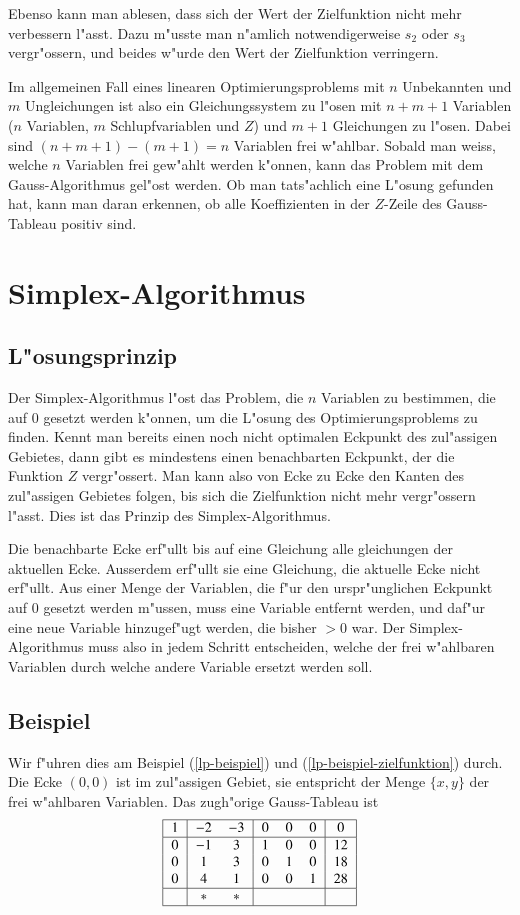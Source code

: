 Ebenso kann man ablesen, dass sich der Wert der Zielfunktion
nicht mehr verbessern l"asst.
Dazu m"usste man n"amlich notwendigerweise $s_2$ oder $s_3$
vergr"ossern, und beides w"urde den Wert der Zielfunktion verringern.

Im allgemeinen Fall eines linearen Optimierungsproblems mit $n$
Unbekannten und $m$ Ungleichungen ist also ein Gleichungssystem
zu l"osen mit $n+m+1$ Variablen ($n$ Variablen, $m$ Schlupfvariablen und
$Z$) und $m+1$ Gleichungen zu l"osen.
Dabei sind $(n+m+1)-(m+1)=n$ Variablen frei w"ahlbar.
Sobald man weiss, welche $n$ Variablen frei gew"ahlt werden k"onnen,
kann das Problem mit dem Gauss-Algorithmus gel"ost werden.
Ob man tats"achlich eine L"osung gefunden hat, kann man daran
erkennen, ob alle Koeffizienten in der $Z$-Zeile des Gauss-Tableau
positiv sind.

\section{Simplex-Algorithmus}
\subsection{L"osungsprinzip}
Der Simplex-Algorithmus l"ost das Problem, die $n$ Variablen
zu bestimmen, die auf $0$ gesetzt werden k"onnen, um die L"osung
des Optimierungsproblems zu finden.
Kennt man bereits einen noch nicht optimalen Eckpunkt des zul"assigen
Gebietes, dann gibt es mindestens einen benachbarten Eckpunkt,
der die Funktion $Z$ vergr"ossert.
Man kann also von Ecke zu Ecke den Kanten des zul"assigen
Gebietes folgen, bis sich die Zielfunktion nicht mehr vergr"ossern
l"asst. Dies ist das Prinzip des Simplex-Algorithmus.

Die benachbarte Ecke erf"ullt bis auf eine Gleichung alle
gleichungen der aktuellen Ecke.
Ausserdem erf"ullt sie eine Gleichung, die aktuelle Ecke nicht
erf"ullt.
Aus einer Menge der Variablen, die f"ur den urspr"unglichen
Eckpunkt auf $0$ gesetzt werden m"ussen, muss eine Variable
entfernt werden, und daf"ur eine neue Variable hinzugef"ugt
werden, die bisher $>0$ war.
Der Simplex-Algorithmus muss also in jedem Schritt entscheiden,
welche der frei w"ahlbaren Variablen durch welche andere 
Variable ersetzt werden soll.

\subsection{Beispiel}
Wir f"uhren dies am Beispiel (\ref{lp-beispiel}) und 
(\ref{lp-beispiel-zielfunktion}) durch.
Die Ecke $(0,0)$ ist im zul"assigen Gebiet, sie entspricht
der Menge $\{x,y\}$ der frei w"ahlbaren Variablen. Das zugh"orige
Gauss-Tableau ist
\[
\begin{tabular}{|>{$}c<{$}|>{$}c<{$}>{$}c<{$}|>{$}c<{$}>{$}c<{$}>{$}c<{$}|>{$}c<{$}|}
\hline
1&-2&-3& 0& 0& 0& 0\\
\hline
0&-1& 3& 1& 0& 0&12\\
0& 1& 3& 0& 1& 0&18\\
0& 4& 1& 0& 0& 1&28\\
\hline
 & *& *&  &  &  &  \\
\hline
\end{tabular}
\]

